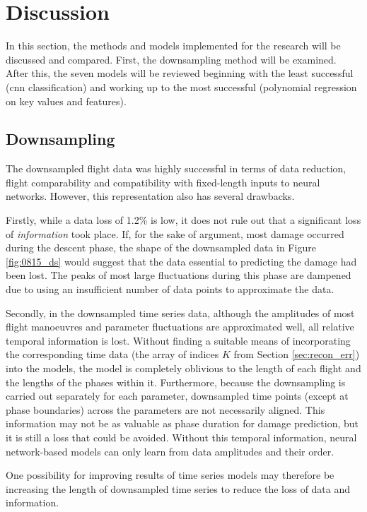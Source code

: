 \chapter{Discussion}
In this section, the methods and models implemented for the research will be discussed and compared. First, the downsampling method will be examined. After this, the seven models will be reviewed beginning with the least successful (\ac{cnn} classification) and working up to the most successful (polynomial regression on key values and features).

\section{Downsampling} \label{sec:disc:downsampling}
The downsampled flight data was highly successful in terms of data reduction, flight comparability and compatibility with fixed-length inputs to neural networks. However, this representation also has several drawbacks.

Firstly, while a data loss of 1.2\% is low, it does not rule out that a significant loss of \textit{information} took place. If, for the sake of argument, most damage occurred during the descent phase, the shape of the downsampled data in Figure \ref{fig:0815_ds} would suggest that the data essential to predicting the damage had been lost. %
The peaks of most large fluctuations during this phase are dampened due to using an insufficient number of data points to approximate the data.

Secondly, in the downsampled time series data, although the amplitudes of most flight manoeuvres and parameter fluctuations are approximated well, all relative temporal information is lost. Without finding a suitable means of incorporating the corresponding time data (the array of indices \(K\) from Section \ref{sec:recon_err}) into the models, the model is completely oblivious to the length of each flight and the lengths of the phases within it. Furthermore, because the downsampling is carried out separately for each parameter, downsampled time points (except at phase boundaries) across the parameters are not necessarily aligned. This information may not be as valuable as phase duration for damage prediction, but it is still a loss that could be avoided. Without this temporal information, neural network-based models can only learn from data amplitudes and their order.

One possibility for improving results of time series models may therefore be increasing the length of downsampled time series to reduce the loss of data and information.

